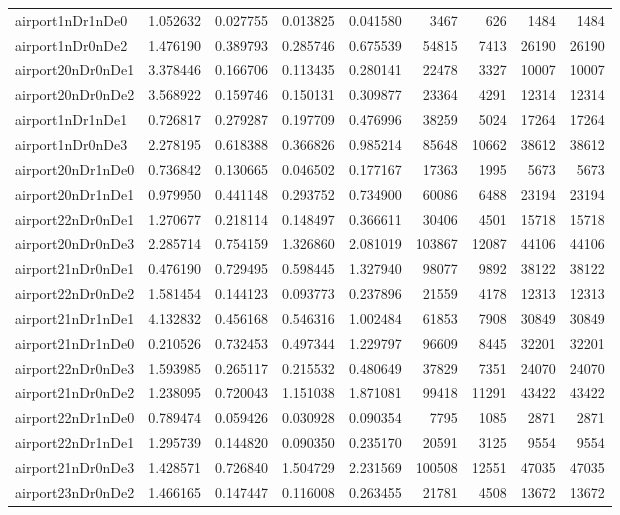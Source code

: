 \begin{longtable}{|l|r|r|r|r|r|r|r|r|}
airport1nDr1nDe0 & 1.052632 & 0.027755 & 0.013825 & 0.041580 & 3467 & 626 & 1484 & 1484 \\
airport1nDr0nDe2 & 1.476190 & 0.389793 & 0.285746 & 0.675539 & 54815 & 7413 & 26190 & 26190 \\
airport20nDr0nDe1 & 3.378446 & 0.166706 & 0.113435 & 0.280141 & 22478 & 3327 & 10007 & 10007 \\
airport20nDr0nDe2 & 3.568922 & 0.159746 & 0.150131 & 0.309877 & 23364 & 4291 & 12314 & 12314 \\
airport1nDr1nDe1 & 0.726817 & 0.279287 & 0.197709 & 0.476996 & 38259 & 5024 & 17264 & 17264 \\
airport1nDr0nDe3 & 2.278195 & 0.618388 & 0.366826 & 0.985214 & 85648 & 10662 & 38612 & 38612 \\
airport20nDr1nDe0 & 0.736842 & 0.130665 & 0.046502 & 0.177167 & 17363 & 1995 & 5673 & 5673 \\
airport20nDr1nDe1 & 0.979950 & 0.441148 & 0.293752 & 0.734900 & 60086 & 6488 & 23194 & 23194 \\
airport22nDr0nDe1 & 1.270677 & 0.218114 & 0.148497 & 0.366611 & 30406 & 4501 & 15718 & 15718 \\
airport20nDr0nDe3 & 2.285714 & 0.754159 & 1.326860 & 2.081019 & 103867 & 12087 & 44106 & 44106 \\
airport21nDr0nDe1 & 0.476190 & 0.729495 & 0.598445 & 1.327940 & 98077 & 9892 & 38122 & 38122 \\
airport22nDr0nDe2 & 1.581454 & 0.144123 & 0.093773 & 0.237896 & 21559 & 4178 & 12313 & 12313 \\
airport21nDr1nDe1 & 4.132832 & 0.456168 & 0.546316 & 1.002484 & 61853 & 7908 & 30849 & 30849 \\
airport21nDr1nDe0 & 0.210526 & 0.732453 & 0.497344 & 1.229797 & 96609 & 8445 & 32201 & 32201 \\
airport22nDr0nDe3 & 1.593985 & 0.265117 & 0.215532 & 0.480649 & 37829 & 7351 & 24070 & 24070 \\
airport21nDr0nDe2 & 1.238095 & 0.720043 & 1.151038 & 1.871081 & 99418 & 11291 & 43422 & 43422 \\
airport22nDr1nDe0 & 0.789474 & 0.059426 & 0.030928 & 0.090354 & 7795 & 1085 & 2871 & 2871 \\
airport22nDr1nDe1 & 1.295739 & 0.144820 & 0.090350 & 0.235170 & 20591 & 3125 & 9554 & 9554 \\
airport21nDr0nDe3 & 1.428571 & 0.726840 & 1.504729 & 2.231569 & 100508 & 12551 & 47035 & 47035 \\
airport23nDr0nDe2 & 1.466165 & 0.147447 & 0.116008 & 0.263455 & 21781 & 4508 & 13672 & 13672 \\

\end{longtable}
